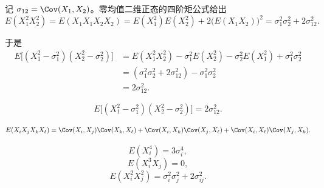 \begin{solution}
记 $\sigma_{12}=\Cov(X_1,X_2)$。零均值二维正态的四阶矩公式给出  
\[
E(X_1^2 X_2^2)
=E(X_1X_1X_2X_2)
=E(X_1^2)E(X_2^2)+2\bigl(E(X_1X_2)\bigr)^2
=\sigma_1^2\sigma_2^2+2\sigma_{12}^2.
\]

于是
\[
\begin{aligned}
E\bigl[(X_1^2-\sigma_1^2)(X_2^2-\sigma_2^2)\bigr]
&=E(X_1^2X_2^2)-\sigma_1^2E(X_2^2)-\sigma_2^2E(X_1^2)+\sigma_1^2\sigma_2^2\\
&=(\sigma_1^2\sigma_2^2+2\sigma_{12}^2)-\sigma_1^2\sigma_2^2\\
&=2\sigma_{12}^2.
\end{aligned}
\]

\[
\boxed{E\bigl[(X_1^2-\sigma_1^2)(X_2^2-\sigma_2^2)\bigr]=2\sigma_{12}^2.}
\]
\end{solution}
\begin{dxtips}

\[
E(X_i X_j X_k X_\ell)
= \Cov(X_i,X_j)\Cov(X_k,X_\ell)
+ \Cov(X_i,X_k)\Cov(X_j,X_\ell)
+ \Cov(X_i,X_\ell)\Cov(X_j,X_k).
\]

\[
E(X_i^4)=3\sigma_i^4,
\]
\[
E(X_i^3 X_j)=0,
\]
\[
E(X_i^2 X_j^2)=\sigma_i^2\sigma_j^2+2\sigma_{ij}^2.
\]
\end{dxtips}
